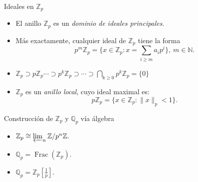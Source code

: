 \documentclass{beamer}
\newcommand{\bb}[1]{\mathbb{#1}}
\theoremstyle{definition}
\numberwithin{equation}{section}
\newcommand{\tit}[1]{\textit{#1}}
\renewcommand{\geq}{\geqslant}
\newcommand{\Z}{\mathbb{Z}}
\newcommand{\Qp}{\mathbb{Q}_p}
\newcommand{\Zp}{\mathbb{Z}_p}
\newcommand{\pnorm}[1]{\|#1\|_p}
\begin{document}
\begin{frame}{Ideales en $\Zp$}
	\begin{itemize}[<+- | alert@+>]
		\item El anillo $\Zp$ es un \textit{dominio de ideales principales}.
		\item Más exactamente, cualquier ideal de $\mathbb{Z}_{p}$ tiene la forma
		\[
		p^{m}\mathbb{Z}_{p}=\Big\{x\in\mathbb{Z}_{p}:x=\sum_{i\geq m}a_{i}p^{i}%
		\Big\},\ m\in\mathbb{N}.
		\]
		\item $\mathbb{Z}_{p} \supset p \mathbb{Z}_{p} \cdots \supset p^{k} \mathbb{Z}_{p} \supset \cdots \supset \bigcap_{k \geq 0} p^{k} \mathbb{Z}_{p}=\{0\}$
		\item $\bb{Z}_p$ es un \tit{anillo local}, cuyo ideal maximal es:
		$$p\bb{Z}_p = \{x\in\bb{Z}_p : \pnorm{x}<1\}.$$
	\end{itemize}
\end{frame}

\begin{frame}{Construcción de $\Zp$ y $\Qp$ vía álgebra}
	\begin{itemize}[<+- | alert@+>]
		\item $\Zp\cong\varprojlim_n \Z/p^n\Z.$
		\item $\bb{Q}_p=\operatorname{Frac} (\Zp).$
		\item $\bb{Q}_p=\bb{Z}_p[\frac{1}{p}]$.
	\end{itemize}
\end{frame}
\iffalse
\end{document}
